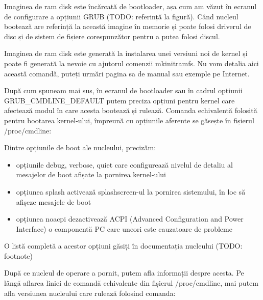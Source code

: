 Imaginea de ram disk este încărcată de bootloader, așa cum am văzut în ecranul
de configurare a opțiunii GRUB (TODO: referință la figură). Când nucleul
bootează are referință la această imagine în memorie și poate folosi driverul de
disc și de sistem de fișiere corespunzător pentru a putea folosi discul.

Imaginea de ram disk este generată la instalarea unei versiuni noi de kernel și
poate fi generată la nevoie cu ajutorul comenzii mkinitramfs. Nu vom detalia
aici această comandă, puteți urmări pagina sa de manual sau exemple pe Internet.

După cum spuneam mai sus, în ecranul de bootloader sau în cadrul opțiunii
GRUB_CMDLINE_DEFAULT putem preciza opțiuni pentru kernel care afectează modul în
care acesta bootează și rulează. Comanda echivalentă folosită pentru bootarea
kernel-ului, împreună cu opțiunile aferente se găsește în fișierul
/proc/cmdline:


Dintre opțiunile de boot ale nucleului, precizăm:

\begin{itemize}
	\item opțiunile debug, verbose, quiet care configurează nivelul de
		detaliu al mesajelor de boot afișate la pornirea kernel-ului
	\item opțiunea splash activează splashscreen-ul la pornirea sistemului,
		în loc să afișeze mesajele de boot
	\item opțiunea noacpi dezactivează ACPI (Advanced Configuration and
		Power Interface) o componentă PC care uneori este cauzatoare de
		probleme
\end{itemize}

O listă completă a acestor opțiuni găsiți în documentația nucleului (TODO:
footnote)

După ce nucleul de operare a pornit, putem afla informații despre acesta. Pe
lângă aflarea liniei de comandă echivalente din fișierul /proc/cmdline, mai
putem afla versiunea nucleului care rulează folosind comanda:


